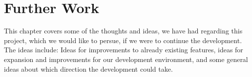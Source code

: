 
\chapter{Further Work}
\label{cha:further_work}

This chapter covers some of the thoughts and ideas, we have had regarding this project, which we would like to persue, if we were to continue the development. The ideas include: Ideas for improvements to already existing features, ideas for expansion and improvements for our development environment, and some general ideas about which direction the development could take. 















